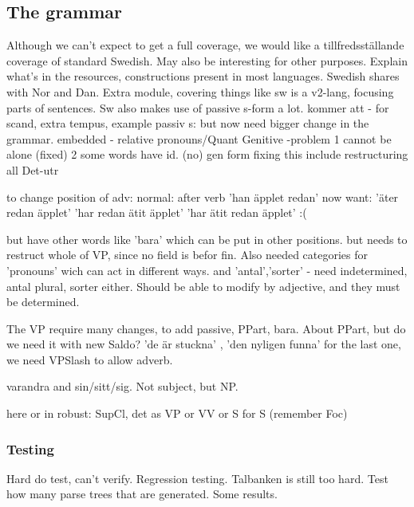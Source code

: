 \documentclass{article}
\begin{document}
\subsection{The grammar}
Although we can't expect to get a full coverage, we would like a tillfredsställande
coverage of standard Swedish. May also be interesting for other purposes.
Explain what's in the resources, constructions present in most languages. 
Swedish shares with Nor and Dan. Extra module, covering things like sw is a
v2-lang, focusing parts of sentences. Sw also makes use of passive s-form a lot.
kommer att - for scand, extra tempus, example
passiv s: but now need bigger change in the grammar. 
embedded - relative
pronouns/Quant
Genitive -problem 1 cannot be alone (fixed) 2 some words have id. (no) gen form
           fixing this include restructuring all
Det-utr

to change position of adv:
normal: after verb 'han äpplet redan'
now want: 'äter redan äpplet'
          'har redan ätit äpplet' 
          'har ätit redan äpplet' :(

but have other words like 'bara' which can be put in other positions.
  but needs to restruct whole of VP, since no field is befor fin.
Also needed categories for 'pronouns' wich can act in different ways.
and 'antal','sorter' - need indetermined, antal plural, sorter either.
Should be able to modify by adjective, and they must be determined.

The VP require many changes, to add passive, PPart, bara.
About PPart, but do we need it with new Saldo? 'de är stuckna' , 'den nyligen funna'
for the last one, we need VPSlash to allow adverb.

varandra and sin/sitt/sig. Not subject, but NP.

here or in robust: SupCl, det as VP or VV or S for S (remember Foc)

\subsubsection{Testing}
Hard do test, can't verify. Regression testing. Talbanken is still too hard.
Test how many parse trees that are generated.
Some results.

\end{document}
